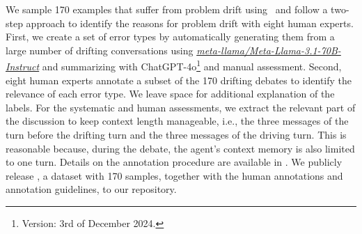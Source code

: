 We sample 170 examples that suffer from problem drift using \metric\ and follow a two-step approach to identify the reasons for problem drift with eight human experts.
First, we create a set of error types by automatically generating them from a large number of drifting conversations using \href{https://huggingface.co/meta-llama/Llama-3.1-70B-Instruct}{\textit{meta-llama/Meta-Llama-3.1-70B-Instruct}} \citep{GrattafioriDJP24a} and summarizing with ChatGPT-4o\footnote{Version: 3rd of December 2024.} and manual assessment.
Second, eight human experts annotate a subset of the 170 drifting debates to identify the relevance of each error type.
We leave space for additional explanation of the labels.
For the systematic and human assessments, we extract the relevant part of the discussion to keep context length manageable, i.e., the three messages of the turn before the drifting turn and the three messages of the driving turn.
This is reasonable because, during the debate, the agent's context memory is also limited to one turn.
Details on the annotation procedure are available in .
We publicly release \dataset, a dataset with 170 samples, together with the human annotations and annotation guidelines, to our repository.

